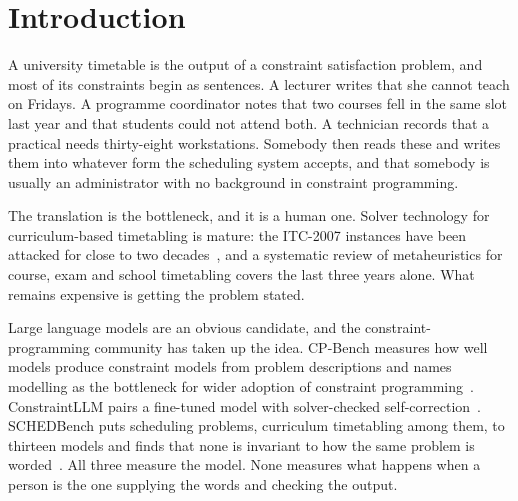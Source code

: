 \documentclass[acmsmall,screen,review,anonymous]{acmart}
\begin{document}


\maketitle

\section{Introduction}

A university timetable is the output of a constraint satisfaction problem, and
most of its constraints begin as sentences. A lecturer writes that she cannot
teach on Fridays. A programme coordinator notes that two courses fell in the
same slot last year and that students could not attend both. A technician
records that a practical needs thirty-eight workstations. Somebody then reads
these and writes them into whatever form the scheduling system accepts, and
that somebody is usually an administrator with no background in constraint
programming.

The translation is the bottleneck, and it is a human one. Solver technology for
curriculum-based timetabling is mature: the ITC-2007 instances have been
attacked for close to two decades~\cite{digaspero2007itc}, and a systematic
review of metaheuristics for course, exam and school timetabling covers the
last three years alone. What remains expensive is getting the problem stated.

Large language models are an obvious candidate, and the constraint-programming
community has taken up the idea. CP-Bench measures how well models produce
constraint models from problem descriptions and names modelling as the
bottleneck for wider adoption of constraint
programming~\cite{michailidis2025cpbench}. ConstraintLLM pairs a fine-tuned
model with solver-checked self-correction~\cite{shi2025constraintllm}.
SCHEDBench puts scheduling problems, curriculum timetabling among them, to
thirteen models and finds that none is invariant to how the same problem is
worded~\cite{sharma2026schedbench}. All three measure the model. None measures
what happens when a person is the one supplying the words and checking the
output.
\end{document}
